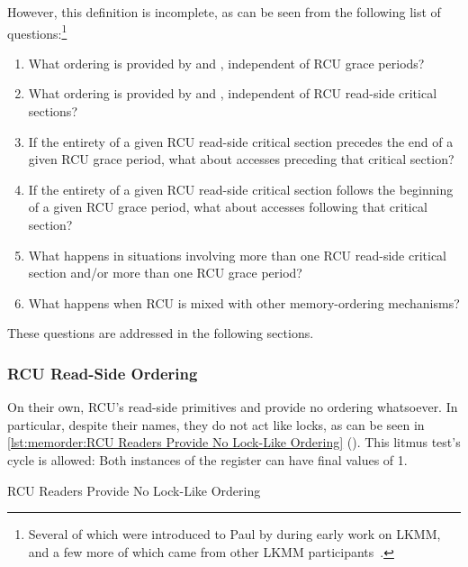 However, this definition is incomplete, as can be seen from the following
list of questions:\footnote{
	Several of which were introduced to Paul by  during
	early work on LKMM, and a few more of which came from other
	LKMM participants~\cite{Alglave:2018:FSC:3173162.3177156}.}

\begin{enumerate}
\item	What ordering is provided by 
	and , independent of RCU grace periods?
\item	What ordering is provided by 
	and , independent of RCU read-side
	critical sections?
\item	If the entirety of a given RCU read-side critical section
	precedes the end of a given RCU grace period, what about
	accesses preceding that critical section?
\item	If the entirety of a given RCU read-side critical section
	follows the beginning of a given RCU grace period, what about
	accesses following that critical section?
\item	What happens in situations involving more than one RCU read-side
	critical section and/or more than one RCU grace period?
\item	What happens when RCU is mixed with other memory-ordering
	mechanisms?
\end{enumerate}

These questions are addressed in the following sections.

\subsubsection{RCU Read-Side Ordering}
\label{sec:memorder:RCU Read-Side Ordering}

On their own, RCU's read-side primitives  and
 provide no ordering whatsoever.
In particular, despite their names, they do not act like locks, as can
be seen in
\cref{lst:memorder:RCU Readers Provide No Lock-Like Ordering}
().
This litmus test's cycle is allowed:
Both instances of the  register can have final values of 1.

\begin{listing}

\caption{RCU Readers Provide No Lock-Like Ordering}
\label{lst:memorder:RCU Readers Provide No Lock-Like Ordering}
\end{listing}


